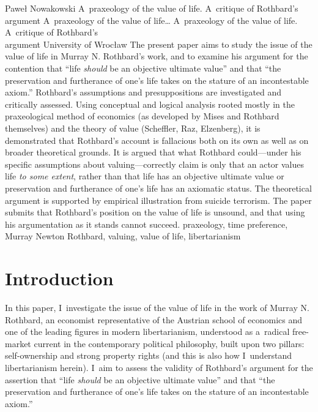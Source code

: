 \begin{artengenv}{Paweł Nowakowski}
	{A~praxeology of the value of life. A~critique of Rothbard's argument}
	{A~praxeology of the value of life\ldots}
	{A~praxeology of the value of life. A~critique of Rothbard's\\argument}
	{University of Wrocław\label{nowakowski-first}}
	{The present paper aims to study the issue of the value of life in Murray N. Rothbard's work, and to examine his argument for the contention that ``life \textit{should} be an objective ultimate value'' and that ``the preservation and furtherance of one's life takes on the stature of an incontestable axiom.'' Rothbard's assumptions and presuppositions are investigated and critically assessed. Using conceptual and logical analysis rooted mostly in the praxeological method of economics (as developed by Mises and Rothbard themselves) and the theory of value (Scheffler, Raz, Elzenberg), it is demonstrated that Rothbard's account is fallacious both on its own as well as on broader theoretical grounds. It is argued that what Rothbard could---under his specific assumptions about valuing---correctly claim is only that an actor values life \textit{to some extent}, rather than that life has an objective ultimate value or preservation and furtherance of one's life has an axiomatic status. The theoretical argument is supported by empirical illustration from suicide terrorism. The paper submits that Rothbard's position on the value of life is unsound, and that using his argumentation as it stands cannot succeed.
	}
	{praxeology, time preference, Murray Newton Rothbard, valuing, value of life, libertarianism}







\section{Introduction}

\lettrine[loversize=0.13,lines=2,lraise=-0.03,nindent=0em,findent=0.2pt]%
{I}{}n this paper, I~investigate the issue of the value of life in the work of Murray N. Rothbard, an economist representative of the Austrian school of economics and one of the leading figures in modern libertarianism, understood as a~radical free-market current in the contemporary political philosophy, built upon two pillars: self-ownership and strong property rights 
\parencites[see][]{Rothbard2006For}[][]{Rothbard2009Man} %
 (and this is also how I~understand libertarianism herein). I~aim to assess the validity of Rothbard's 
\parencite*[][pp.32–33]{Rothbard1998Ethics} %
 argument for the assertion that ``life \textit{should} be an objective ultimate value'' and that ``the preservation and furtherance of one's life takes on the stature of an incontestable axiom.''




\end{artengenv}
